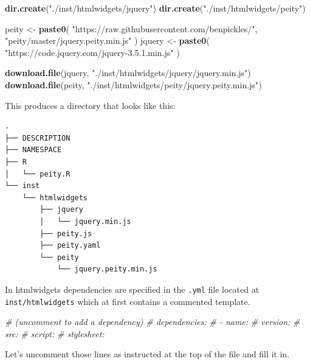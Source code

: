 \documentclass[
]{krantz}
\makeatletter
\newenvironment{Shaded}{\begin{snugshade}}{\end{snugshade}}
\newcommand{\CommentTok}[1]{\textcolor[rgb]{0.37,0.37,0.37}{\textit{#1}}}
\newcommand{\KeywordTok}[1]{\textcolor[rgb]{0.27,0.27,0.27}{\textbf{#1}}}
\newcommand{\NormalTok}[1]{#1}
\newcommand{\StringTok}[1]{\textcolor[rgb]{0.5,0.5,0.5}{#1}}
\newenvironment{kframe}{%
\medskip{}
\setlength{\fboxsep}{.8em}
 \def\at@end@of@kframe{}%
 \ifinner\ifhmode%
  \def\at@end@of@kframe{\end{minipage}}%
  \begin{minipage}{\columnwidth}%
 \fi\fi%
 \def\FrameCommand##1{\hskip\@totalleftmargin \hskip-\fboxsep
 \colorbox{shadecolor}{##1}\hskip-\fboxsep
     \hskip-\linewidth \hskip-\@totalleftmargin \hskip\columnwidth}%
 \MakeFramed {\advance\hsize-\width
   \@totalleftmargin\z@ \linewidth\hsize
   \@setminipage}}%
 {\par\unskip\endMakeFramed%
 \at@end@of@kframe}
\renewenvironment{Shaded}{\begin{kframe}}{\end{kframe}}
\makeatother
\begin{document}
\begin{Shaded}
\begin{Highlighting}[]
\KeywordTok{dir.create}\NormalTok{(}\StringTok{"./inst/htmlwidgets/jquery"}\NormalTok{)}
\KeywordTok{dir.create}\NormalTok{(}\StringTok{"./inst/htmlwidgets/peity"}\NormalTok{)}

\NormalTok{peity <{-}}\StringTok{ }\KeywordTok{paste0}\NormalTok{(}
  \StringTok{"https://raw.githubusercontent.com/benpickles/"}\NormalTok{,}
  \StringTok{"peity/master/jquery.peity.min.js"}
\NormalTok{)}
\NormalTok{jquery <{-}}\StringTok{ }\KeywordTok{paste0}\NormalTok{(}
  \StringTok{"https://code.jquery.com/jquery{-}3.5.1.min.js"}
\NormalTok{)}

\KeywordTok{download.file}\NormalTok{(jquery, }\StringTok{"./inst/htmlwidgets/jquery/jquery.min.js"}\NormalTok{)}
\KeywordTok{download.file}\NormalTok{(peity, }\StringTok{"./inst/htmlwidgets/peity/jquery.peity.min.js"}\NormalTok{)}
\end{Highlighting}
\end{Shaded}

This produces a directory that looks like this:

\begin{verbatim}
.
├── DESCRIPTION
├── NAMESPACE
├── R
│   └── peity.R
└── inst
    └── htmlwidgets
        ├── jquery
        │   └── jquery.min.js
        ├── peity.js
        ├── peity.yaml
        └── peity
            └── jquery.peity.min.js
\end{verbatim}

In htmlwidgets dependencies are specified in the \texttt{.yml} file located at \texttt{inst/htmlwidgets} which at first contains a commented template.

\begin{Shaded}
\begin{Highlighting}[]
\CommentTok{\# (uncomment to add a dependency)}
\CommentTok{\# dependencies:}
\CommentTok{\#  {-} name:}
\CommentTok{\#    version:}
\CommentTok{\#    src:}
\CommentTok{\#    script:}
\CommentTok{\#    stylesheet:}
\end{Highlighting}
\end{Shaded}

Let's uncomment those lines as instructed at the top of the file and fill it in.
\end{document}
